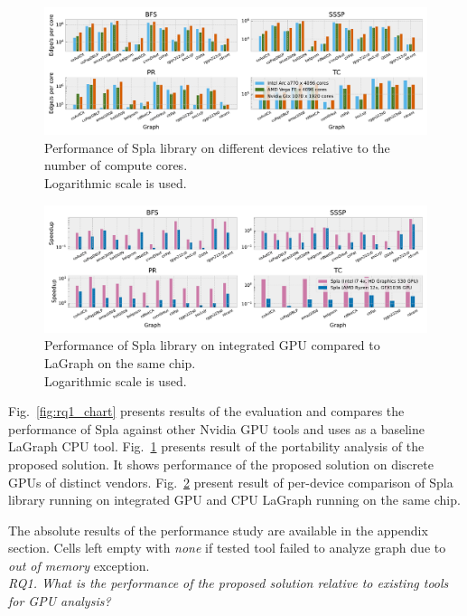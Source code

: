 \begin{figure}[tbp]
\centering
\includegraphics[width=1.0\linewidth]{plots/rq2_cores.pdf}
\caption{Performance of Spla library on different devices relative to the number of compute cores.\\Logarithmic scale is used.}
\label{fig:rq2_chart}
\end{figure}

\begin{figure}[tbp]
\centering
\includegraphics[width=1.0\linewidth]{plots/rq3_int.pdf}
\caption{Performance of Spla library on integrated GPU compared to LaGraph on the same chip.\\Logarithmic scale is used.}
\label{fig:rq3_chart}
\end{figure}

Fig.~\ref{fig:rq1_chart} presents results of the evaluation and compares the performance of Spla against other Nvidia GPU tools and uses as a baseline LaGraph CPU tool. 
Fig.~\ref{fig:rq2_chart} presents result of the portability analysis of the proposed solution. It shows performance of the proposed solution on discrete GPUs of distinct vendors.
Fig.~\ref{fig:rq3_chart} present result of per-device comparison of Spla library running on integrated GPU and CPU LaGraph running on the same chip. 

The absolute results of the performance study are available in the appendix section. Cells left empty with \textit{none} if tested tool failed to analyze graph due to \textit{out of memory} exception.\\

\textit{RQ1. What is the performance of the proposed solution relative to existing tools for GPU analysis?}\\


